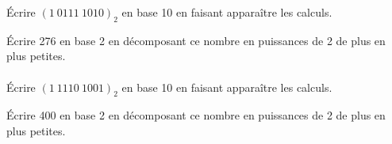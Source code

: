 \documentclass[a4paper,12pt]{article}
\begin{document}

\'Ecrire $(1\ 0111\ 1010)_2$ en base 10 en faisant apparaître les calculs.\\


\'Ecrire 276 en base 2 en décomposant ce nombre en puissances de 2 de plus en plus petites.\\

\\

\'Ecrire $(1\ 1110\ 1001)_2$ en base 10 en faisant apparaître les calculs.\\


\newpage

\'Ecrire 400 en base 2 en décomposant ce nombre en puissances de 2 de plus en plus petites.\\

\\
\end{document}
